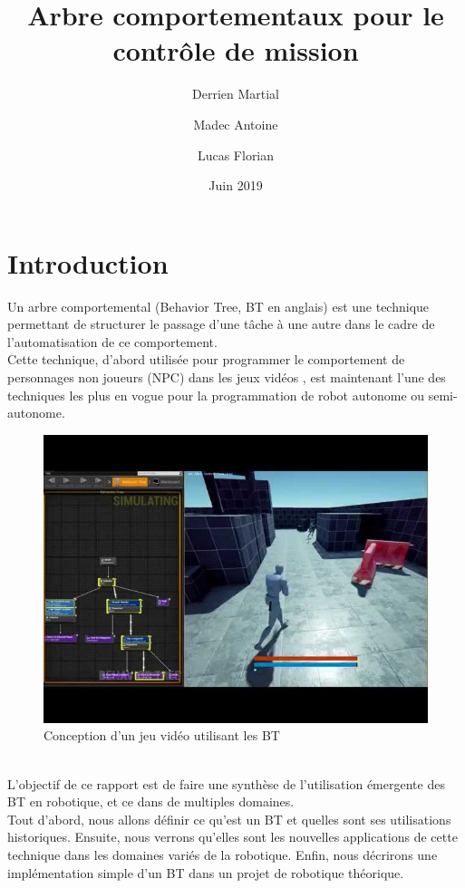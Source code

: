 \documentclass[titlepage]{article}
\title{Arbre comportementaux pour le contr\^ole de mission}
\author{
	Derrien Martial \\
	\and
	Madec Antoine \\
	\and
	Lucas Florian
}
\date{Juin 2019}
\begin{document}
	\maketitle
	\tableofcontents
	\hypersetup{linktocpage}
	
	\clearpage
	\section{Introduction}
	Un arbre comportemental (Behavior Tree, BT en anglais) est une
	technique permettant de structurer le passage d'une tâche à une autre dans 
	le cadre de l'automatisation de ce comportement.
	\\
	Cette technique, d'abord utilisée pour programmer le comportement de personnages non joueurs (NPC) dans les jeux vidéos \cite{wikipedia_BT}, est maintenant l'une des techniques les plus en vogue pour la programmation de robot autonome ou semi-autonome\cite{ros.org}.
	\\
	\begin{figure}[h!]
		\includegraphics[width=\linewidth]{img/videogame_tree.jpg}
		\caption{Conception d'un jeu vidéo utilisant les BT}
		\label{fig:BT2}
	\end{figure}
	\\
	L'objectif de ce rapport est de faire une synthèse de l'utilisation émergente des BT en robotique, et ce dans de multiples domaines.
	\\
	Tout d'abord, nous allons définir ce qu'est un BT et quelles sont ses utilisations historiques. Ensuite, nous verrons qu'elles sont les nouvelles applications de cette technique dans les domaines variés de la robotique. Enfin, nous décrirons une implémentation simple d'un BT dans un projet de robotique théorique.
	
\end{document}
